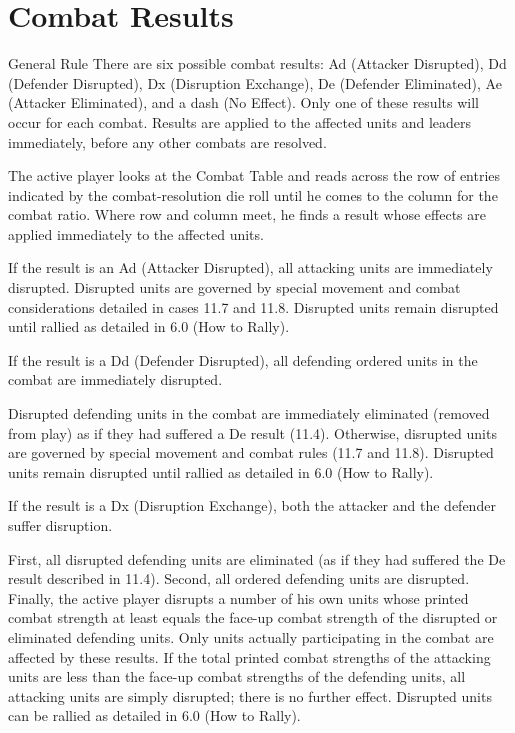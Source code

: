 \section{Combat Results}

\begin{rulebox}{General Rule}
There are six possible combat results: Ad (Attacker Disrupted), Dd (Defender Disrupted), Dx (Disruption Exchange), De (Defender Eliminated), Ae (Attacker Eliminated), and a dash (No Effect). Only one of these results will occur for each combat. Results are applied to the affected units and leaders immediately, before any other combats are resolved.
\end{rulebox}


The active player looks at the Combat Table and reads across the row of entries indicated by the combat-resolution die roll until he comes to the column for the combat ratio. Where row and column meet, he finds a result whose effects are applied immediately to the affected units.

 If the result is an Ad (Attacker Disrupted), all attacking units are immediately disrupted. Disrupted units are governed by special movement and combat considerations detailed in cases 11.7 and 11.8. Disrupted units remain disrupted until rallied as detailed in 6.0 (How to Rally).

 If the result is a Dd (Defender Disrupted), all defending ordered units in the combat are immediately disrupted.

Disrupted defending units in the combat are immediately eliminated (removed from play) as if they had suffered a De result (11.4). Otherwise, disrupted units are governed by special movement and combat rules (11.7 and 11.8). Disrupted units remain disrupted until rallied as detailed in 6.0 (How to Rally).

 If the result is a Dx (Disruption Exchange), both the attacker and the defender suffer disruption.

First, all disrupted defending units are eliminated (as if they had suffered the De result described in 11.4). Second, all ordered defending units are disrupted. Finally, the active player disrupts a number of his own units whose printed combat strength at least equals the face-up combat strength of the disrupted or eliminated defending units. Only units actually participating in the combat are affected by these results. If the total printed combat strengths of the attacking units are less than the face-up combat strengths of the defending units, all attacking units are simply disrupted; there is no further effect. Disrupted units can be rallied as detailed in 6.0 (How to Rally).

